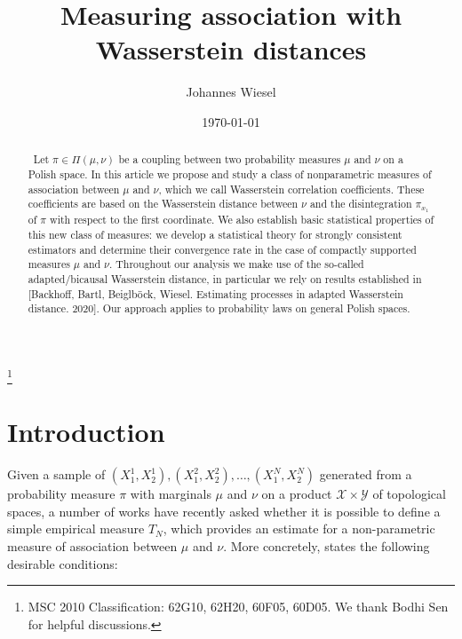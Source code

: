 \documentclass[10pt]{amsart}
\begin{document}
\title[A Wasserstein estimator for measuring association]{Measuring association with Wasserstein distances}

\date{\today}

\author{Johannes Wiesel}
\address{Johannes Wiesel\newline
Columbia University, Department of Statistics Amsterdam Avenue\newline
New York, NY 10027, USA}


\begin{abstract}
\ Let $\pi\in \Pi(\mu,\nu)$ be a coupling between two probability measures $\mu$ and $\nu$ on a Polish space. In this article we propose and study a class of nonparametric measures of association between $\mu$ and $\nu$, which we call Wasserstein correlation coefficients. These coefficients are based on the Wasserstein distance between $\nu$ and the disintegration $\pi_{x_1}$ of $\pi$ with respect to the first coordinate. We also establish basic statistical properties of this new class of measures: we develop a statistical theory for strongly consistent estimators and determine their convergence rate in the case of compactly supported measures $\mu$ and $\nu$. Throughout our analysis we make use of the so-called adapted/bicausal Wasserstein distance, in particular we rely on results established in [Backhoff, Bartl, Beiglb\"ock, Wiesel. Estimating processes in adapted Wasserstein distance. 2020]. Our approach applies to probability laws on general Polish spaces. 
\end{abstract}

\thanks{MSC 2010 Classification: 62G10, 62H20, 60F05, 60D05. We thank Bodhi Sen for helpful discussions.}

\maketitle

\section{Introduction}


Given a sample of $(X_1^1, X_2^1), (X_1^2, X_2^2), \dots, (X_1^N, X_2^N) $ generated from a probability measure $\pi$ with marginals $\mu$ and $\nu$ on a product $\mathcal{X}\times \mathcal{Y}$ of topological spaces, a number of works have recently asked whether it is possible to define a simple empirical measure $T_N$, which provides an estimate for a non-parametric measure of association between $\mu$ and $\nu$. More concretely, \cite[Abstract]{chatterjee2020new} states the following desirable conditions:
\end{document}
